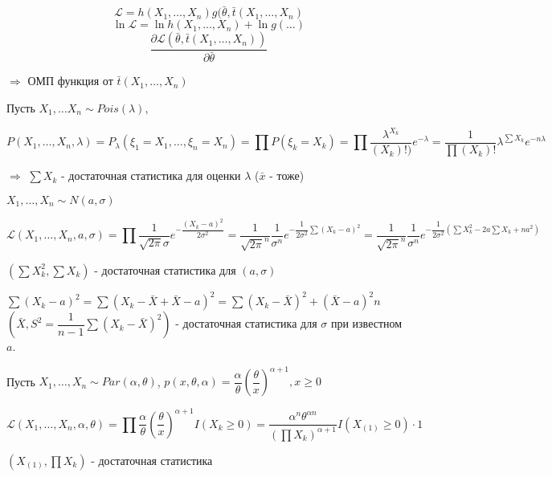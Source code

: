 \begin{remark}
  \[
    \mathscr{L} = h(X_1, \dots, X_n) g(\bar\theta, \bar t(X_1, \dots, X_n)
  \]
  \[
    \ln \mathscr{L} = \ln h(X_1, \dots, X_n) + \ln g(\dots)
  \]
  \[
    \dfrac{\partial \mathscr{L} (\bar\theta, \bar t(X_1, \dots, X_n))}{\partial \bar\theta}  
  \]

  $\Rightarrow$ ОМП функция от $\bar t(X_1, \dots, X_n)$

\end{remark}

\begin{ex}
  Пусть $X_1, \dots X_n \sim Pois(\lambda)$, 

  \[
    P(X_1, \dots, X_n, \lambda) = P_\lambda (\xi_1=X_1, \dots, \xi_n=X_n) = \prod P(\xi_k = X_k) = \prod \dfrac{\lambda^{X_k}}{(X_k)!)} e^{-\lambda} = \dfrac{1}{\prod (X_k)!} \lambda^{\sum X_k} e^{-n\lambda}
  \]

  $\Rightarrow$ $\sum X_k$ - достаточная статистика для оценки $\lambda$ ($\bar x$ - тоже)
\end{ex}

\begin{ex}
  $X_1, \dots, X_n \sim N(a, \sigma)$

  \[
    \mathscr{L} (X_1, \dots, X_n, a, \sigma) = \prod \dfrac{1}{\sqrt{2\pi} \sigma} e^{-\dfrac{(X_k-a)^2}{2\sigma^2}} = \dfrac{1}{\sqrt{2\pi}^n} \dfrac{1}{\sigma^n} e^{-\dfrac{1}{2\sigma^2} \sum (X_k-a)^2} = \dfrac{1}{\sqrt{2\pi}^n} \dfrac{1}{\sigma^n} e^{-\dfrac{1}{2\sigma^2} (\sum X_k^2 - 2a \sum X_k + na^2)}
  \]

  $(\sum X_k^2, \sum X_k)$ - достаточная статистика для $(a, \sigma)$

  $\sum (X_k-a)^2 = \sum (X_k - \bar X + \bar X - a)^2 = \sum (X_k-\bar X)^2 + (\bar X - a)^2 n$
  $(\bar X, S^2 = \dfrac{1}{n-1} \sum (X_k-\bar X)^2)$ - достаточная статистика для $\sigma$ при известном $a$.
\end{ex}

\begin{ex}
  Пусть $X_1, \dots, X_n \sim Par(\alpha, \theta)$,
  $p(x, \theta, \alpha) = \dfrac{\alpha}{\theta} \left(\dfrac{\theta}{x}\right)^{\alpha+1}, x\geqslant 0$

  \[
    \mathscr{L} (X_1, \dots, X_n, \alpha, \theta) = \prod \dfrac{\alpha}{\theta} (\dfrac{\theta}{x})^{\alpha+1} I(X_k \geqslant 0) = \dfrac{\alpha^n \theta^{\alpha n}}{(\prod X_k)^{\alpha+1}} I(X_{(1)}\geqslant 0) \cdot 1
  \]

  $(X_{(1)}, \prod X_k)$ - достаточная статистика
\end{ex}


